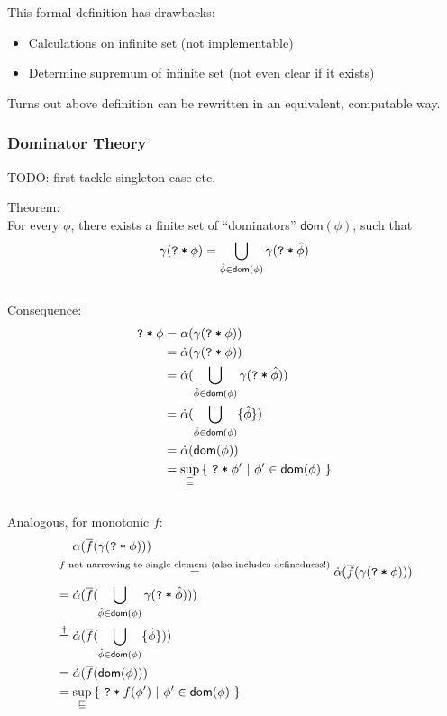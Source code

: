 \documentclass[11pt,a4paper]{article}
\newcommand{\ttt}{\texttt}
\newcommand{\predicate}{\textsf}
\newcommand{\dom}{\predicate{dom}}
\newcommand{\qm}{\ttt{?}}
\newcommand{\withqm}[1]{\ttt{\qm\:*\:$#1$}}
\begin{document}
This formal definition has drawbacks:
\begin{itemize}
    \item Calculations on infinite set (not implementable)
    \item Determine supremum of infinite set (not even clear if it exists)
\end{itemize}

Turns out above definition can be rewritten in an equivalent, computable way.

\subsubsection{Dominator Theory}
TODO: first tackle singleton case etc.

Theorem:\\
For every $\phi$, there exists a finite set of “dominators” $\dom(\phi)$, such that 
$$\gamma(\withqm{\phi}) = \bigcup_{\hat{\phi} \in \dom(\phi)} \gamma(\withqm{\hat{\phi}})$$
~\\

Consequence: 
\begin{align*}
\withqm{\phi} 
&= \alpha(\gamma(\withqm{\phi})) \\
&= \dalpha(\gamma(\withqm{\phi})) \\
&= \dalpha(\bigcup_{\hat{\phi} \in \dom(\phi)} \gamma(\withqm{\hat{\phi}})) \\
&= \dalpha(\bigcup_{\hat{\phi} \in \dom(\phi)} \{ \hat{\phi} \}) \\
&= \dalpha(\dom(\phi)) \\
&= \sup_{\sqsubseteq} {\{~ \withqm{\phi'} ~|~ \phi' \in \dom(\phi) ~\}}
\end{align*}
~\\
Analogous, for monotonic $f$: 
\begin{align*}
&~~~~ \alpha(\overline{f}(\gamma(\withqm{\phi}))) \\
&\overset{f \text{ not narrowing to single element (also includes definedness!)}}{=} \dalpha(\overline{f}(\gamma(\withqm{\phi}))) \\
&= \dalpha(\overline{f}(\bigcup_{\hat{\phi} \in \dom(\phi)} \gamma(\withqm{\hat{\phi}}))) \\
&\overset{\dagger}{=} \dalpha(\overline{f}(\bigcup_{\hat{\phi} \in \dom(\phi)} \{ \hat{\phi} \})) \\
&= \dalpha(\overline{f}(\dom(\phi))) \\
&= \sup_{\sqsubseteq} {\{~ \withqm{f(\phi')} ~|~ \phi' \in \dom(\phi) ~\}}
\end{align*}
\end{document}
